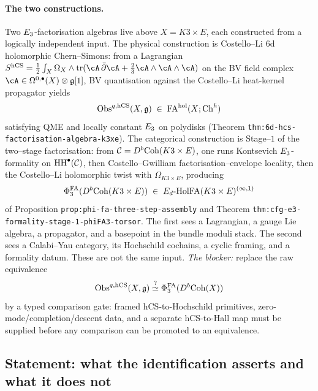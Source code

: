 \paragraph{The two constructions.}
Two $E_3$-factorisation algebras live above $X = K3 \times E$, each
constructed from a logically independent input. The physical
construction is Costello--Li $6$d holomorphic Chern--Simons: from a
Lagrangian $S^{\hCS} = \tfrac12 \int_X \Omega_X \wedge \mathrm{tr}(\cA \,
\bar\partial \cA + \tfrac{2}{3} \cA \wedge \cA \wedge \cA)$ on the BV
field complex $\cA \in \Omega^{0,\bullet}(X) \otimes \frakg[1]$, BV
quantisation against the Costello--Li heat-kernel propagator yields
\[
 \mathrm{Obs}^{q,\mathrm{hCS}}(X, \mathfrak g) \;\in\; \mathrm{FA}^{\mathrm{hol}}(X; \mathrm{Ch}^\hbar)
\]
satisfying QME and locally constant $E_3$ on polydisks (Theorem
\texttt{thm:6d-hcs-factorisation-algebra-k3xe}). The categorical
construction is Stage--$1$ of the two--stage factorisation: from
$\mathcal C = D^b\mathrm{Coh}(K3 \times E)$, one runs Kontsevich $E_3$-formality on
$\mathrm{HH}^\bullet(\mathcal C)$, then Costello--Gwilliam factorisation--envelope
locality, then the Costello--Li holomorphic twist with
$\Omega_{K3 \times E}$, producing
\[
 \Phi^{\mathrm{FA}}_3(D^b\mathrm{Coh}(K3 \times E)) \;\in\; E_d\text{-}\mathrm{HolFA}(K3 \times E)^{(\infty,1)}
\]
of Proposition \texttt{prop:phi-fa-three-step-assembly} and
Theorem \texttt{thm:cfg-e3-formality-stage-1-phiFA3-torsor}.
The first sees a Lagrangian, a gauge Lie algebra, a propagator, and a
basepoint in the bundle moduli stack. The second sees a Calabi--Yau
category, its Hochschild cochains, a cyclic framing, and a formality
datum. These are not the same input. \emph{The blocker:} replace the
raw equivalence
\[
 \mathrm{Obs}^{q,\mathrm{hCS}}(X,\mathfrak g)\stackrel{?}{\simeq}
 \Phi^{\mathrm{FA}}_3(D^b\mathrm{Coh}(X))
\]
by a typed comparison gate: framed hCS-to-Hochschild primitives,
zero-mode/completion/descent data, and a separate hCS-to-Hall map must
be supplied before any comparison can be promoted to an equivalence.

\subsection*{Statement: what the identification asserts and what it does not}

